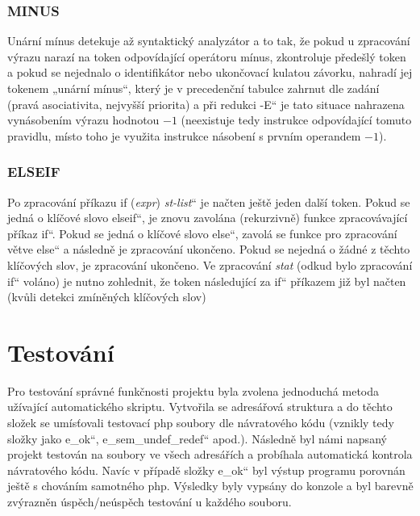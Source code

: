 \documentclass[12pt,a4paper,titlepage,final]{article}
\newcommand{\myuv}[1]{\quotedblbase #1\textquotedblleft}
\newcommand{\exitem}[1]{\textlangle \emph{#1}\textrangle}
\begin{document}
\subsubsection{MINUS}
Unární mínus detekuje až syntaktický analyzátor a to tak, že pokud 
u zpracování výrazu narazí na token odpovídající operátoru mínus, zkontroluje 
předešlý token a pokud se nejednalo o identifikátor nebo ukončovací kulatou 
závorku, nahradí jej tokenem „unární mínus“, který je v precedenční tabulce 
zahrnut dle zadání (pravá asociativita, nejvyšší priorita) a 
při redukci \myuv{-E} je tato situace nahrazena vynásobením výrazu hodnotou $-1$ 
(neexistuje tedy instrukce odpovídající tomuto pravidlu, místo toho je
využita instrukce násobení s prvním operandem $-1$).

\subsubsection{ELSEIF}
Po zpracování příkazu 
\myuv{if (\exitem{expr}) \textbraceleft\exitem{st-list}\textbraceright}
je načten ještě jeden další 
token. Pokud se jedná o klíčové slovo \myuv{elseif}, je znovu zavolána 
(rekurzivně) funkce zpracovávající příkaz \myuv{if}. Pokud se jedná o klíčové 
slovo \myuv{else}, zavolá se funkce pro zpracování větve \myuv{else} a následně 
je zpracování ukončeno. Pokud se nejedná o žádné z těchto klíčových slov, je 
zpracování ukončeno. Ve zpracování \exitem{stat} (odkud bylo 
zpracování \myuv{if} voláno) je nutno zohlednit, že token následující 
za \myuv{if} příkazem již byl načten (kvůli detekci zmíněných klíčových slov)


\section{Testování} \label{testovani}
Pro testování správné funkčnosti projektu byla zvolena jednoduchá metoda 
užívající automatického skriptu. Vytvořila se adresářová struktura a 
do těchto složek se umísťovali testovací php soubory dle návratového kódu 
(vznikly tedy složky jako \myuv{e\_ok}, \myuv{e\_sem\_undef\_redef} apod.).
Následně byl námi napsaný projekt testován na soubory ve všech adresářích 
a probíhala automatická kontrola návratového kódu. Navíc v případě složky 
\myuv{e\_ok} byl výstup programu porovnán ještě s chováním samotného php. 
Výsledky byly vypsány do konzole a byl barevně zvýrazněn úspěch/neúspěch 
testování u každého souboru. 
\end{document}
